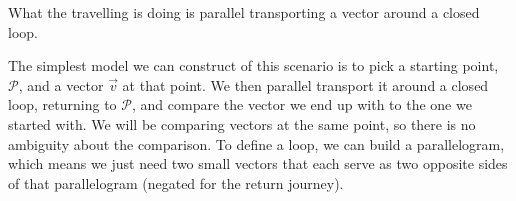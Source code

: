 What the travelling is doing is parallel transporting a vector around a closed loop.

The simplest model we can construct of this scenario is to pick a starting point, $\mathcal{P}$, and a vector $\vec{v}$ at that point. We then parallel transport it around a closed loop, returning to $\mathcal{P}$, and compare the vector we end up with to the one we started with. We will be comparing vectors at the same point, so there is no ambiguity about the comparison. To define a loop, we can build a parallelogram, which means we just need two small vectors that each serve as two opposite sides of that parallelogram (negated for the return journey).

